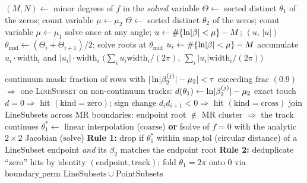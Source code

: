 \begin{algorithm}
\caption{\textsc{AverageWindingFromZeros}$(\mathrm{poly},E,\mu_1,\mu_2,\mathrm{zeros},\mathrm{direction})$ —
average winding and non-zero angular area from the crossing zeros.}
\label{alg:winding-from-zeros}
\begin{algorithmic}[1]
\State $(M,N)\gets$ minor degrees of $f$ in the \emph{solved} variable
 
  \State $\Theta\gets$ sorted distinct $\theta_1$ of the zeros; count variable $\mu\gets\mu_2$
\Else {}
  \State $\Theta\gets$ sorted distinct $\theta_2$ of the zeros; count variable $\mu\gets\mu_1$
\EndIf
{}
  \State solve once at any angle; $u\gets\#\{\ln\lvert \beta\rvert<\mu\}-M$; \Return $(u,\,|u|)$
\EndIf
{}
  \State $\theta_{\mathrm{mid}}\gets(\Theta_i+\Theta_{i+1})/2$; solve roots at $\theta_{\mathrm{mid}}$
  \State $u_i\gets\#\{\ln\lvert \beta\rvert<\mu\}-M$ 
  \State accumulate $u_i\cdot\mathrm{width}_i$ and $|u_i|\cdot\mathrm{width}_i$
\EndFor
\State \Return $\big(\sum_i u_i\mathrm{width}_i/(2\pi),\ \sum_i|u_i|\mathrm{width}_i/(2\pi)\big)$ 
\end{algorithmic}
\end{algorithm}

\begin{algorithm}
\caption{\textsc{ExtractAmoebaSubsets}$(zm,\allowbreak \mathrm{poly},\allowbreak E,\allowbreak \mu_1,\allowbreak \mu_2;\allowbreak \mathrm{mode},\allowbreak \tau,\allowbreak \mathrm{frac})$\\
continuum lines and refined discrete points, with boundary dedup.}
\label{alg:extract-amoeba}
\begin{algorithmic}[1]
  \State continuum mask: fraction of rows with $|\ln\lvert \beta_2^{(j)}\rvert-\mu_2|<\tau$ exceeding $\mathrm{frac}$ $(0.9)$ $\Rightarrow$ one \textsc{LineSubset}
  \State on non-continuum tracks: $d(\theta_1)\gets\ln\lvert \beta_2^{(j)}\rvert-\mu_2$
  \State exact touch $d=0\Rightarrow$ hit $(\mathrm{kind}{=}\mathrm{zero})$; sign change $d_i d_{i+1}<0\Rightarrow$ hit $(\mathrm{kind}{=}\mathrm{cross})$
\EndFor
\State join LineSubsets across MR boundaries: endpoint root $\notin$ MR cluster $\Rightarrow$ the track continues
  \State $\theta_1^*\gets$ linear interpolation ($\mathrm{coarse}$) \textbf{or} fsolve of $f=0$ with the analytic $2\times2$ Jacobian ($\mathrm{solve}$)
  \State \textbf{Rule 1:} drop if $\theta_1^*$ within $\mathrm{snap\_tol}$ (circular distance) of a LineSubset endpoint \emph{and} its $\beta_2$ matches the endpoint root
  \State \textbf{Rule 2:} deduplicate ``zero'' hits by identity $(\mathrm{endpoint},\mathrm{track})$; fold $\theta_1=2\pi$ onto $0$ via $\mathrm{boundary\_perm}$
\EndFor
\State \Return $\mathrm{LineSubsets}\cup\mathrm{PointSubsets}$
\end{algorithmic}
\end{algorithm}


